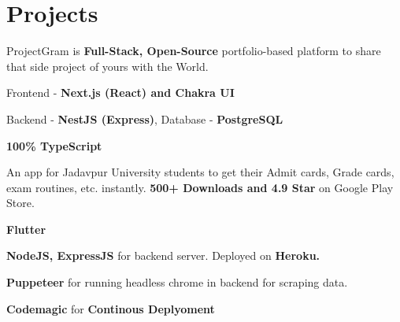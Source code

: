 \documentclass[]{deedy-resume-openfont}
\begin{document}
\begin{minipage}[t]{0.67\textwidth} 





\section{Projects}

ProjectGram is \textbf{Full-Stack, Open-Source} portfolio-based platform to share that side project of yours with the World.
\\
\vspace{\topsep} %
\begin{tightemize}
\item Frontend - \textbf{Next.js (React) and Chakra UI }
\item Backend - \textbf {NestJS (Express)}, Database - \textbf {PostgreSQL}
\item \textbf {100\% TypeScript}
\end{tightemize}
\sectionsep



An app for Jadavpur University students to get their Admit cards, Grade cards, exam routines, etc. instantly. \textbf{500+ Downloads and 4.9 Star} on Google Play Store.\\
\begin{tightemize}
\item \textbf{Flutter}
\item \textbf{NodeJS, ExpressJS} for backend server. Deployed on \textbf{Heroku.}
\item \textbf{Puppeteer} for running headless chrome in backend for scraping data.
\item \textbf{Codemagic} for \textbf{Continous Deplyoment}
\end{tightemize}
\sectionsep



\end{minipage}
\end{document}
